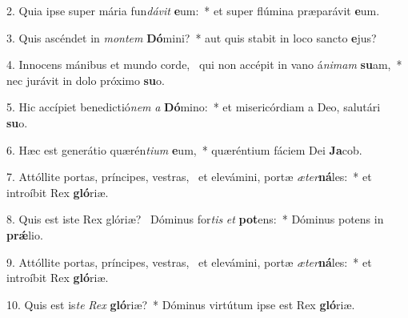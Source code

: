 2. Quia ipse super mária fun\textit{dá}\textit{vit} \textbf{e}um:~*  et super flúmina præparávit \textbf{e}um.\

3. Quis ascéndet in \textit{mon}\textit{tem} \textbf{Dó}mini?~*  aut quis stabit in loco sancto \textbf{e}jus?\

4. Innocens mánibus et mundo corde, \dag\  qui non accépit in vano á\textit{ni}\textit{mam} \textbf{su}am,~*  nec jurávit in dolo próximo \textbf{su}o.\

5. Hic accípiet benedictió\textit{nem} \textit{a} \textbf{Dó}mino:~*  et misericórdiam a Deo, salutári \textbf{su}o.\

6. Hæc est generátio quærén\textit{ti}\textit{um} \textbf{e}um,~*  quæréntium fáciem Dei \textbf{Ja}cob.\

7. Attóllite portas, príncipes, vestras, \dag\  et elevámini, portæ \textit{æ}\textit{ter}\textbf{ná}les:~*  et introíbit Rex \textbf{gló}riæ.\

8. Quis est iste Rex glóriæ? \dag\  Dóminus for\textit{tis} \textit{et} \textbf{pot}ens:~*  Dóminus potens in \textbf{prǽ}lio.\

9. Attóllite portas, príncipes, vestras, \dag\  et elevámini, portæ \textit{æ}\textit{ter}\textbf{ná}les:~*  et introíbit Rex \textbf{gló}riæ.\

10. Quis est is\textit{te} \textit{Rex} \textbf{gló}riæ?~*  Dóminus virtútum ipse est Rex \textbf{gló}riæ.\

